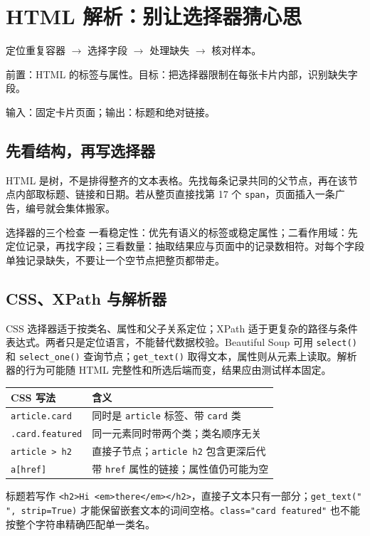 \chapter{HTML 解析：别让选择器猜心思}\label{ch:html}
\begin{tcolorbox}[title=章首知识地图,colframe=Ink]
定位重复容器 $\longrightarrow$ 选择字段 $\longrightarrow$ 处理缺失 $\longrightarrow$ 核对样本。
\end{tcolorbox}

\begin{tcolorbox}[title=学习目标与前置知识,colframe=Ink!65,colback=Ink!2]
前置：HTML 的标签与属性。目标：把选择器限制在每张卡片内部，识别缺失字段。\par
输入：固定卡片页面；输出：标题和绝对链接。
\end{tcolorbox}

\section{先看结构，再写选择器}
HTML 是树，不是排得整齐的文本表格。先找每条记录共同的父节点，再在该节点内部取标题、链接和日期。若从整页直接找第 17 个 \texttt{span}，页面插入一条广告，编号就会集体搬家。

\begin{method}{选择器的三个检查}
一看稳定性：优先有语义的标签或稳定属性；二看作用域：先定位记录，再找字段；三看数量：抽取结果应与页面中的记录数相符。对每个字段单独记录缺失，不要让一个空节点把整页都带走。
\end{method}

\section{CSS、XPath 与解析器}
CSS 选择器适于按类名、属性和父子关系定位；XPath 适于更复杂的路径与条件表达式。两者只是定位语言，不能替代数据校验。Beautiful Soup 可用 \texttt{select()} 和 \texttt{select\_one()} 查询节点；\texttt{get\_text()} 取得文本，属性则从元素上读取。解析器的行为可能随 HTML 完整性和所选后端而变，结果应由测试样本固定。

\begin{center}\small
\begin{tabularx}{\textwidth}{@{}p{}X@{}}
\toprule
CSS 写法 & 含义\\\midrule
\texttt{article.card} & 同时是 \texttt{article} 标签、带 \texttt{card} 类\\
\texttt{.card.featured} & 同一元素同时带两个类；类名顺序无关\\
\texttt{article > h2} & 直接子节点；\texttt{article h2} 包含更深后代\\
\texttt{a[href]} & 带 \texttt{href} 属性的链接；属性值仍可能为空\\
\bottomrule
\end{tabularx}
\end{center}
标题若写作 \texttt{<h2>Hi <em>there</em></h2>}，直接子文本只有一部分；\texttt{get\_text(" ", strip=True)} 才能保留嵌套文本的词间空格。\texttt{class="card featured"} 也不能按整个字符串精确匹配单一类名。

